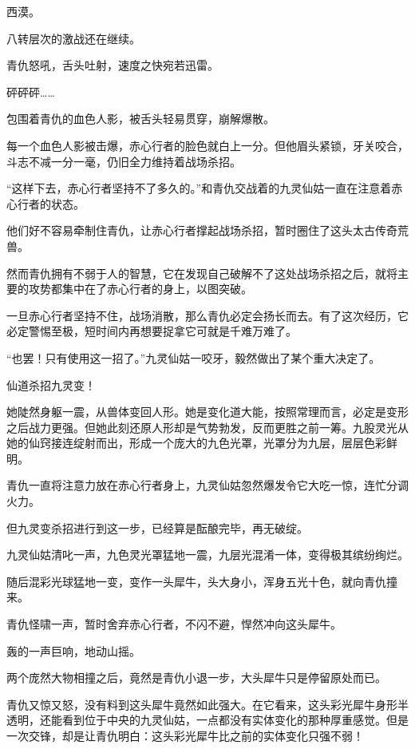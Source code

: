 
\begin{this_body}

西漠。

八转层次的激战还在继续。

青仇怒吼，舌头吐射，速度之快宛若迅雷。

砰砰砰……

包围着青仇的血色人影，被舌头轻易贯穿，崩解爆散。

每一个血色人影被击爆，赤心行者的脸色就白上一分。但他眉头紧锁，牙关咬合，斗志不减一分一毫，仍旧全力维持着战场杀招。

“这样下去，赤心行者坚持不了多久的。”和青仇交战着的九灵仙姑一直在注意着赤心行者的状态。

他们好不容易牵制住青仇，让赤心行者撑起战场杀招，暂时圈住了这头太古传奇荒兽。

然而青仇拥有不弱于人的智慧，它在发现自己破解不了这处战场杀招之后，就将主要的攻势都集中在了赤心行者的身上，以图突破。

一旦赤心行者坚持不住，战场消散，那么青仇必定会扬长而去。有了这次经历，它必定警惕至极，短时间内再想要捉拿它可就是千难万难了。

“也罢！只有使用这一招了。”九灵仙姑一咬牙，毅然做出了某个重大决定了。

仙道杀招九灵变！

她陡然身躯一震，从兽体变回人形。她是变化道大能，按照常理而言，必定是变形之后战力更强。但她此刻还原人形却是气势勃发，反而更胜之前一筹。九股灵光从她的仙窍接连绽射而出，形成一个庞大的九色光罩，光罩分为九层，层层色彩鲜明。

青仇一直将注意力放在赤心行者身上，九灵仙姑忽然爆发令它大吃一惊，连忙分调火力。

但九灵变杀招进行到这一步，已经算是酝酿完毕，再无破绽。

九灵仙姑清叱一声，九色灵光罩猛地一震，九层光混淆一体，变得极其缤纷绚烂。

随后混彩光球猛地一变，变作一头犀牛，头大身小，浑身五光十色，就向青仇撞来。

青仇怪啸一声，暂时舍弃赤心行者，不闪不避，悍然冲向这头犀牛。

轰的一声巨响，地动山摇。

两个庞然大物相撞之后，竟然是青仇小退一步，大头犀牛只是停留原处而已。

青仇又惊又怒，没有料到这头犀牛竟然如此强大。在它看来，这头彩光犀牛身形半透明，还能看到位于中央的九灵仙姑，一点都没有实体变化的那种厚重感觉。但是一次交锋，却是让青仇明白：这头彩光犀牛比之前的实体变化只强不弱！


\end{this_body}
